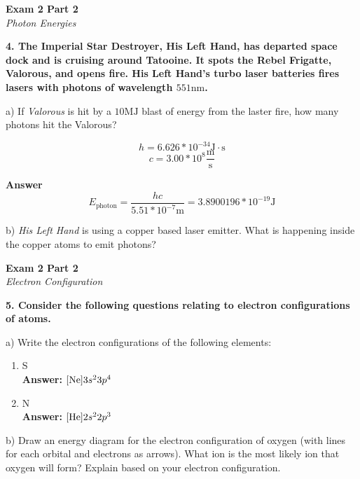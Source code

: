 \documentclass{article}
\begin{document}
    \pagebreak

    \begin{center}
        \textbf{Exam 2 Part 2}\\
        \textit{Photon Energies}
    \end{center}
    \textbf{4. The Imperial Star Destroyer, His Left Hand, has departed space dock and is cruising around Tatooine. It spots the Rebel Frigatte, Valorous, and opens fire. His Left Hand's turbo laser batteries fires lasers with photons of wavelength $551 \si{\nano\meter}$.}

    a) If \textit{Valorous} is hit by a $10 \si{\mega\joule}$ blast of energy from the laster fire, how many photons hit the Valorous?

    $$ h = 6.626 * 10^{-34} \si{\joule} \cdot \si{\second}$$
    $$ c = 3.00 * 10^{8} \frac{\si{\meter}}{\si{\second}} $$

    \textbf{Answer}\\
    $$ E_{\text{photon}} = \dfrac{hc}{5.51 * 10^{-7} \si{\meter}} = 3.8900196 * 10^{-19} \si{\joule} $$

    b) \textit{His Left Hand} is using a copper based laser emitter. What is happening inside the copper atoms to emit photons?

    \pagebreak

    \begin{center}
        \textbf{Exam 2 Part 2}\\
        \textit{Electron Configuration}
    \end{center}
    \textbf{5. Consider the following questions relating to electron configurations of atoms.}

    a) Write the electron configurations of the following elements:
    \begin{enumerate}
        \item S\\
        \textbf{Answer: }
        $[\ce{Ne}]3s^{2}3p^{4}$
        \item N\\
        \textbf{Answer: }
        $[\ce{He}]2s^{2}2p^{3}$
    \end{enumerate}

    b) Draw an energy diagram for the electron configuration of oxygen (with lines for each orbital and electrons as arrows). What ion is the most likely ion that oxygen will form? Explain based on your electron configuration.
\end{document}
